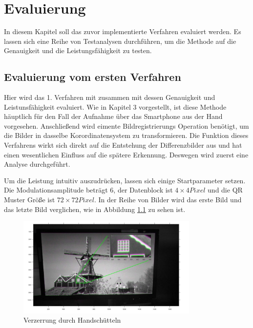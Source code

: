 \chapter{Evaluierung} \label{cha:Evaluierung}

In diesem Kapitel soll das zuvor implementierte Verfahren evaluiert werden. Es lassen sich eine Reihe von Testanalysen durchführen, um die Methode auf die Genauigkeit und die Leistungsfähigkeit zu testen.


\section{Evaluierung vom ersten Verfahren}

Hier wird das 1. Verfahren mit zusammen mit dessen Genauigkeit und Leistunsfähigkeit evaluiert. Wie in Kapitel 3 vorgestellt, ist diese Methode häuptlich für den Fall der Aufnahme über das Smartphone aus der Hand vorgesehen. Anschließend wird eimente Bildregistrierungs Operation benötigt, um die Bilder in dasselbe Korordinatensystem zu transformieren. Die Funktion dieses Verfahrens wirkt sich direkt auf die Entstehung der Differenzbilder aus und hat einen wesentlichen Einfluss auf die spätere Erkennung. Deswegen wird zuerst eine Analyse durchgeführt.

Um die Leistung intuitiv auszudrücken, lassen sich einige Startparameter setzen. Die Modulationsamplitude beträgt 6, der Datenblock ist $ 4 \times 4 Pixel$ und die QR Muster Größe ist $ 72 \times 72 Pixel $.  In der Reihe von Bilder wird das erste Bild und das letzte Bild verglichen, wie in Abbildung \ref{fig:vorregistration} zu sehen ist. 
\begin{figure}[H]
 \centering 
  \includegraphics[keepaspectratio,width=0.8\textwidth]{images/5_Implementirung/vorregistration.pdf}
 \caption{Verzerrung durch Handschütteln}
 \label{fig:vorregistration}
\end{figure}

